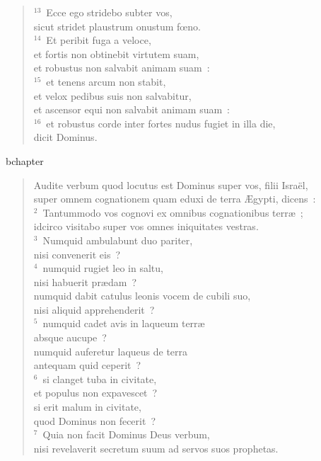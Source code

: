 \begin{verse}
${}^{13}$~Ecce ego stridebo subter vos,\\ sicut stridet plaustrum onustum fœno.\\
${}^{14}$~Et peribit fuga a veloce,\\ et fortis non obtinebit virtutem suam,\\ et robustus non salvabit animam suam~:\\
${}^{15}$~et tenens arcum non stabit,\\ et velox pedibus suis non salvabitur,\\ et ascensor equi non salvabit animam suam~:\\
${}^{16}$~et robustus corde inter fortes nudus fugiet in illa die,\\ dicit Dominus.\end{verse}


bchapter\begin{verse}\vspace{-19pt}Audite verbum quod locutus est Dominus super vos, filii Isra\"el,\\ super omnem cognationem quam eduxi de terra \AE gypti, dicens~:\\
${}^{2}$~Tantummodo vos cognovi ex omnibus cognationibus terr\ae~;\\ idcirco visitabo super vos omnes iniquitates vestras.\\
${}^{3}$~Numquid ambulabunt duo pariter,\\ nisi convenerit eis~?\\
${}^{4}$~numquid rugiet leo in saltu,\\ nisi habuerit pr\ae dam~?\\ numquid dabit catulus leonis vocem de cubili suo,\\ nisi aliquid apprehenderit~?\\
${}^{5}$~numquid cadet avis in laqueum terr\ae \\ absque aucupe~?\\ numquid auferetur laqueus de terra\\ antequam quid ceperit~?\\
${}^{6}$~si clanget tuba in civitate,\\ et populus non expavescet~?\\ si erit malum in civitate,\\ quod Dominus non fecerit~?\\
${}^{7}$~Quia non facit Dominus Deus verbum,\\ nisi revelaverit secretum suum ad servos suos prophetas.\\

\end{verse}

